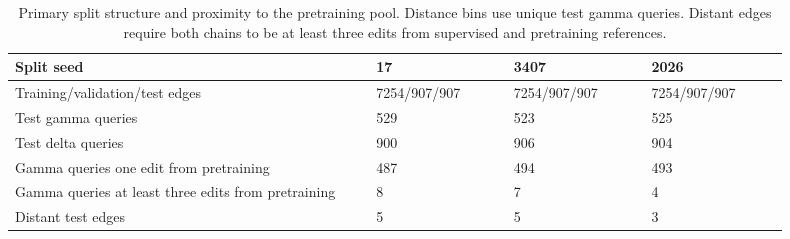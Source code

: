 \begin{table}[ht]
\centering
\caption{Primary split structure and proximity to the pretraining pool. Distance bins use unique test gamma queries. Distant edges require both chains to be at least three edits from supervised and pretraining references.}
\label{tab:data}
\small
\setlength{\tabcolsep}{3pt}
\begin{tabular}{p{0.4200\linewidth}p{0.1600\linewidth}p{0.1600\linewidth}p{0.1600\linewidth}}
\toprule
Split seed & 17 & 3407 & 2026\\
\midrule
Training/validation/test edges & 7254/907/907 & 7254/907/907 & 7254/907/907\\
Test gamma queries & 529 & 523 & 525\\
Test delta queries & 900 & 906 & 904\\
Gamma queries one edit from pretraining & 487 & 494 & 493\\
Gamma queries at least three edits from pretraining & 8 & 7 & 4\\
Distant test edges & 5 & 5 & 3\\
\bottomrule
\end{tabular}
\end{table}
